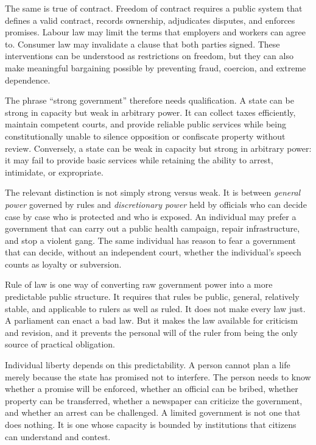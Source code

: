 ﻿\documentclass[12pt,a4paper]{book}
\begin{document}
The same is true of contract.  Freedom of contract requires a public system
that defines a valid contract, records ownership, adjudicates disputes, and
enforces promises.  Labour law may limit the terms that employers and
workers can agree to.  Consumer law may invalidate a clause that both
parties signed.  These interventions can be understood as restrictions on
freedom, but they can also make meaningful bargaining possible by preventing
fraud, coercion, and extreme dependence.

The phrase ``strong government'' therefore needs qualification.  A state can
be strong in capacity but weak in arbitrary power.  It can collect taxes
efficiently, maintain competent courts, and provide reliable public services
while being constitutionally unable to silence opposition or confiscate
property without review.  Conversely, a state can be weak in capacity but
strong in arbitrary power: it may fail to provide basic services while
retaining the ability to arrest, intimidate, or expropriate.

The relevant distinction is not simply strong versus weak.  It is between
\emph{general power} governed by rules and \emph{discretionary power} held by
officials who can decide case by case who is protected and who is exposed.
An individual may prefer a government that can carry out a public health
campaign, repair infrastructure, and stop a violent gang.  The same
individual has reason to fear a government that can decide, without an
independent court, whether the individual's speech counts as loyalty or
subversion.

Rule of law is one way of converting raw government power into a more
predictable public structure.  It requires that rules be public, general,
relatively stable, and applicable to rulers as well as ruled.  It does not
make every law just.  A parliament can enact a bad law.  But it makes the
law available for criticism and revision, and it prevents the personal will
of the ruler from being the only source of practical obligation.

Individual liberty depends on this predictability.  A person cannot plan a
life merely because the state has promised not to interfere.  The person
needs to know whether a promise will be enforced, whether an official can
be bribed, whether property can be transferred, whether a newspaper can
criticize the government, and whether an arrest can be challenged.  A
limited government is not one that does nothing.  It is one whose capacity
is bounded by institutions that citizens can understand and contest.
\end{document}
